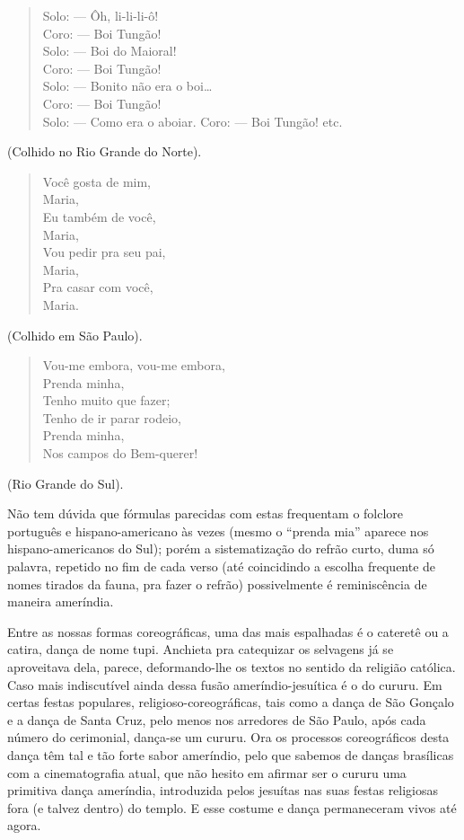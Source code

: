 \begin{verse}
Solo: --- Ôh, li-li-li-ô!\\
Coro: --- Boi Tungão!\\
Solo: --- Boi do Maioral!\\
Coro: --- Boi Tungão!\\
Solo: --- Bonito não era o boi\ldots{}\\
Coro: --- Boi Tungão!\\
Solo: --- Como era o aboiar. Coro: --- Boi Tungão! etc.
\end{verse}

(Colhido no Rio Grande do Norte).

\begin{verse}
Você gosta de mim,\\
Maria,\\
Eu também de você,\\
Maria,\\
Vou pedir pra seu pai,\\
Maria,\\
Pra casar com você,\\
Maria.
\end{verse}

(Colhido em São Paulo).

\begin{verse}
Vou-me embora, vou-me embora,\\
Prenda minha,\\
Tenho muito que fazer;\\
Tenho de ir parar rodeio,\\
Prenda minha,\\
Nos campos do Bem-querer!
\end{verse}

(Rio Grande do Sul).

Não tem dúvida que fórmulas parecidas com estas frequentam o folclore
português e hispano-americano às vezes (mesmo o ``prenda mia'' aparece
nos hispano-americanos do Sul); porém a sistematização do refrão curto,
duma só palavra, repetido no fim de cada verso (até coincidindo a
escolha frequente de nomes tirados da fauna, pra fazer o refrão)
possivelmente é reminiscência de maneira ameríndia.

Entre as nossas formas coreográficas, uma das mais espalhadas é o
cateretê ou a catira, dança de nome tupi. Anchieta pra catequizar os
selvagens já se aproveitava dela, parece, deformando-lhe os textos no
sentido da religião católica. Caso mais indiscutível ainda dessa fusão
ameríndio-jesuítica é o do cururu. Em certas festas populares,
religioso-coreográficas, tais como a dança de São Gonçalo e a dança de
Santa Cruz, pelo menos nos arredores de São Paulo, após cada número do
cerimonial, dança-se um cururu. Ora os processos coreográficos desta
dança têm tal e tão forte sabor ameríndio, pelo que sabemos de danças
brasílicas com a cinematografia atual, que não hesito em afirmar ser o
cururu uma primitiva dança ameríndia, introduzida pelos jesuítas nas
suas festas religiosas fora (e talvez dentro) do templo. E esse costume
e dança permaneceram vivos até agora.

